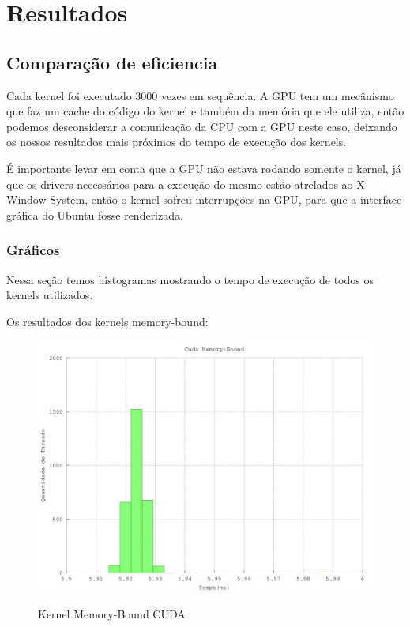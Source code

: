 \section{Resultados}
\subsection{Comparação de eficiencia}
Cada kernel foi executado 3000 vezes em sequência. A GPU tem um mecânismo que faz um cache do código do kernel e também
da memória que ele utiliza, então podemos desconsiderar a comunicação da CPU com a GPU neste caso, deixando os nossos resultados 
mais próximos do tempo de execução dos kernels.

É importante levar em conta que a GPU não estava rodando somente o kernel, já que os drivers necessários para a execução 
do mesmo estão atrelados ao X Window System, então o kernel sofreu interrupções na GPU, para que a interface gráfica do 
Ubuntu fosse renderizada.

\subsubsection{Gráficos}
Nessa seção temos histogramas mostrando o tempo de execução de todos os kernels
utilizados.

Os resultados dos kernels memory-bound:

\begin{figure}[H]
  \begin{center}
    \includegraphics[scale=0.6]{resultados_cuda_memory_histo.jpg}
    \label{fig:Kernel Memory-Bound CUDA}
    \caption{Kernel Memory-Bound CUDA}
  \end{center}
\end{figure}


